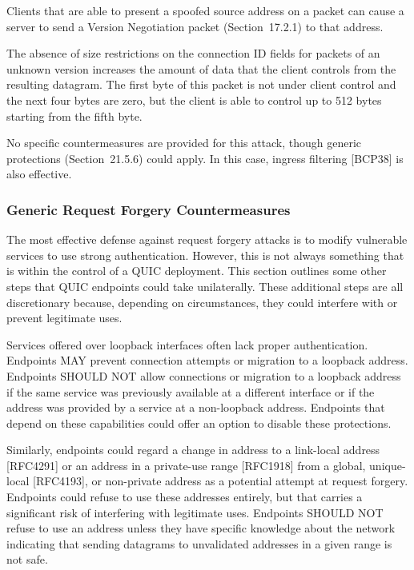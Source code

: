 \documentclass{article}
\begin{document}
Clients that are able to present a spoofed source address on a packet can cause a server to send a Version Negotiation packet (Section~17.2.1) to that address.

The absence of size restrictions on the connection ID fields for packets of an unknown version increases the amount of data that the client controls from the resulting datagram.  The first byte of this packet is not under client control and the next four bytes are zero, but the client is able to control up to 512 bytes starting from the fifth byte.

No specific countermeasures are provided for this attack, though generic protections (Section~21.5.6) could apply.  In this case, ingress filtering [BCP38] is also effective.

\subsubsection{Generic Request Forgery Countermeasures}

The most effective defense against request forgery attacks is to modify vulnerable services to use strong authentication.  However, this is not always something that is within the control of a QUIC deployment.  This section outlines some other steps that QUIC endpoints could take unilaterally.  These additional steps are all discretionary because, depending on circumstances, they could interfere with or prevent legitimate uses.

Services offered over loopback interfaces often lack proper authentication.  Endpoints MAY prevent connection attempts or migration to a loopback address.  Endpoints SHOULD NOT allow connections or migration to a loopback address if the same service was previously available at a different interface or if the address was provided by a service at a non-loopback address.  Endpoints that depend on these capabilities could offer an option to disable these protections.

Similarly, endpoints could regard a change in address to a link-local address [RFC4291] or an address in a private-use range [RFC1918] from a global, unique-local [RFC4193], or non-private address as a potential attempt at request forgery.  Endpoints could refuse to use these addresses entirely, but that carries a significant risk of interfering with legitimate uses.  Endpoints SHOULD NOT refuse to use an address unless they have specific knowledge about the network indicating that sending datagrams to unvalidated addresses in a given range is not safe.
\end{document}
